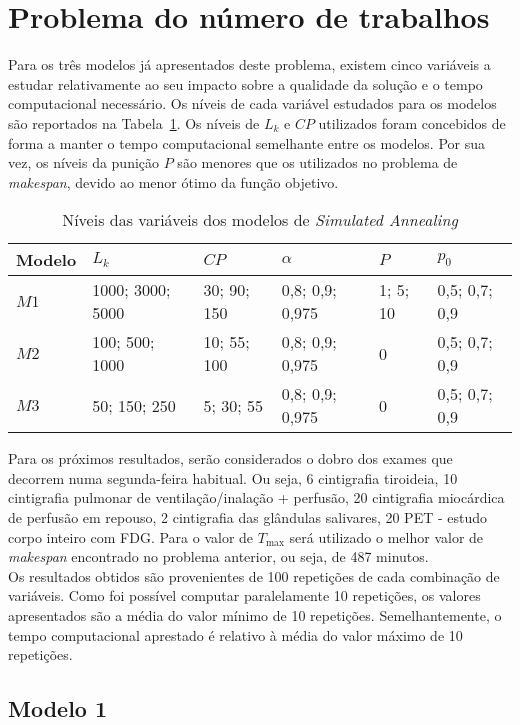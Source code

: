 \section{Problema do número de trabalhos}

Para os três modelos já apresentados deste problema, existem cinco variáveis a estudar relativamente ao seu impacto sobre a qualidade da solução e o tempo computacional necessário. Os níveis de cada variável estudados para os modelos são reportados na Tabela~\ref{tab:niveis_P2}. Os níveis de $L_{k}$ e $CP$ utilizados foram concebidos de forma a manter o tempo computacional semelhante entre os modelos. Por sua vez, os níveis da punição $P$ são menores que os utilizados no problema de \textit{makespan}, devido ao menor ótimo da função objetivo.\\
\begin{table}[H]
\caption{Níveis das variáveis dos modelos de \textit{Simulated Annealing}}
\label{tab:niveis_P2}
\begin{tabular}{llllll}
\hline
Modelo & $L_{k}$          & $CP$        & $\alpha$        & $P$      & $p_{0}$       \\ \hline
$M1$   & 1000; 3000; 5000 & 30; 90; 150 & 0,8; 0,9; 0,975 & 1; 5; 10 & 0,5; 0,7; 0,9 \\
$M2$   & 100; 500; 1000   & 10; 55; 100 & 0,8; 0,9; 0,975 & 0        & 0,5; 0,7; 0,9 \\
$M3$   & 50; 150; 250     & 5; 30; 55   & 0,8; 0,9; 0,975 & 0        & 0,5; 0,7; 0,9
\end{tabular}
\end{table}

Para os próximos resultados, serão considerados o dobro dos exames que decorrem numa segunda-feira habitual. Ou seja, 6 cintigrafia tiroideia, 10 cintigrafia pulmonar de ventilação/inalação + perfusão, 20 cintigrafia miocárdica de perfusão em repouso, 2 cintigrafia das glândulas salivares, 20 PET - estudo corpo inteiro com FDG. Para o valor de $T_{\max}$ será utilizado o melhor valor de \textit{makespan} encontrado no problema anterior, ou seja, de 487 minutos.\\
Os resultados obtidos são provenientes de 100 repetições de cada combinação de variáveis. Como foi possível computar paralelamente 10 repetições, os valores apresentados são a média do valor mínimo de 10 repetições. Semelhantemente, o tempo computacional aprestado é relativo à média do valor máximo de 10 repetições.\\

\subsection{Modelo 1}

